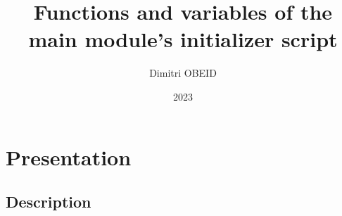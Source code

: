 \documentclass[a4paper,10pt]{article}
\title{\color{sec1}Functions and variables of the \\main module's initializer script}\color{text}
\author{Dimitri OBEID}
\date{2023}
\begin{document}
    \maketitle
    \newpage

    \hypertarget{contents}{}
    \tableofcontents
    \newpage

    \color{sec1}
    \section{Presentation}\color{text}

    \color{sec2}
    \subsection{Description}\color{text}
\end{document}

